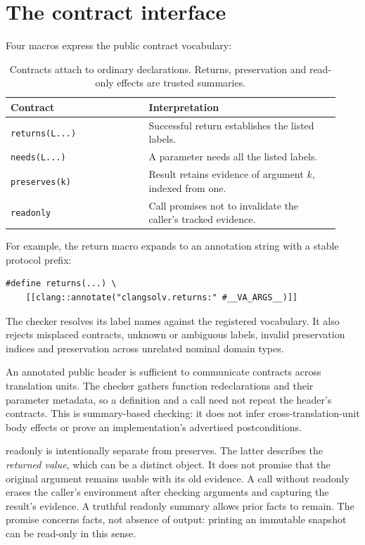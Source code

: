 \documentclass[11pt]{article}
\begin{document}
\section{The contract interface}
Four macros express the public contract vocabulary:
\begin{table}[ht]
\centering\small
\begin{tabular}{p{0.39\linewidth}p{0.54\linewidth}}
\toprule
Contract & Interpretation\\
\midrule
\texttt{returns(L...)} & Successful return establishes the listed labels.\\
\texttt{needs(L...)} & A parameter needs all the listed labels.\\
\texttt{preserves(k)} & Result retains evidence of argument $k$, indexed from one.\\
\texttt{readonly} & Call promises not to invalidate the caller's tracked evidence.\\
\bottomrule
\end{tabular}
\caption{Contracts attach to ordinary declarations. Returns, preservation and
read-only effects are trusted summaries.}
\end{table}

For example, the return macro expands to an annotation string with a stable
protocol prefix:
\begin{lstlisting}
#define returns(...) \
    [[clang::annotate("clangsolv.returns:" #__VA_ARGS__)]]
\end{lstlisting}
The checker resolves its label names against the registered vocabulary. It
also rejects misplaced contracts, unknown or ambiguous labels, invalid
preservation indices and preservation across unrelated nominal domain types.

An annotated public header is sufficient to communicate contracts across
translation units. The checker gathers function redeclarations and their
parameter metadata, so a definition and a call need not repeat the header's
contracts. This is summary-based checking: it does not infer cross-translation-unit
body effects or prove an implementation's advertised postconditions.

readonly is intentionally separate from preserves. The latter describes the
\emph{returned value}, which can be a distinct object. It does not promise that
the original argument remains usable with its old evidence. A call without
readonly erases the caller's environment after checking arguments and capturing
the result's evidence. A truthful readonly summary allows prior facts to remain.
The promise concerns facts, not absence of output: printing an immutable
snapshot can be read-only in this sense.
\end{document}
